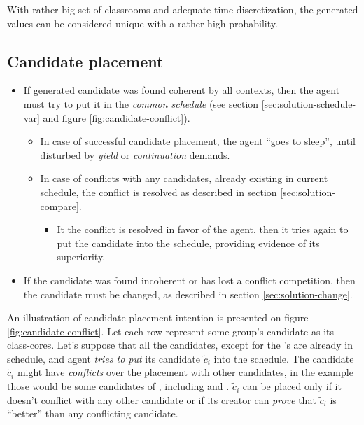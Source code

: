 \documentclass[../../header]{subfiles}
\begin{document}
\begin{note}
  With rather big set of classrooms and adequate time discretization, the generated
  values can be considered unique with a rather high probability.
\end{note}



\subsection{Candidate placement}
\begin{itemize}
  \item If generated candidate was found coherent by all contexts,
        then the agent must try to put it in the \emph{common schedule}
        (see section \ref{sec:solution-schedule-var} and figure \ref{fig:candidate-conflict}).
        \begin{itemize}
          \item In case of successful candidate placement, the agent ``goes to sleep'',
                until disturbed by \emph{yield} or \emph{continuation} demands.
          \item In case of conflicts with any candidates, already existing
                in current schedule, the conflict is resolved as described
                in section \ref{sec:solution-compare}.
                \begin{itemize}
                  \item It the conflict is resolved in favor of the agent,
                        then it tries again to put the candidate into the
                        schedule, providing evidence of its superiority.
                \end{itemize}
        \end{itemize}
  \item If the candidate was found incoherent or has lost a conflict competition,
        then the candidate must be changed, as described in section
        \ref{sec:solution-change}.
\end{itemize}

An illustration of candidate placement intention is presented on figure
\ref{fig:candidate-conflict}.
Let each row represent some group's candidate as its class-cores.
Let's suppose that all the candidates, except for the 's
are already in schedule, and agent  \emph{tries to put}
its candidate $\tilde{c}_i$ into the schedule.
The candidate $\tilde{c}_i$ might have \emph{conflicts} over the
placement with other candidates, in the example those would be
some candidates of , including  and
. $\tilde{c}_i$ can be placed only if it doesn't conflict
with any other candidate or if its creator can \emph{prove} that
$\tilde{c}_i$ is ``better'' than any conflicting candidate.
\end{document}
